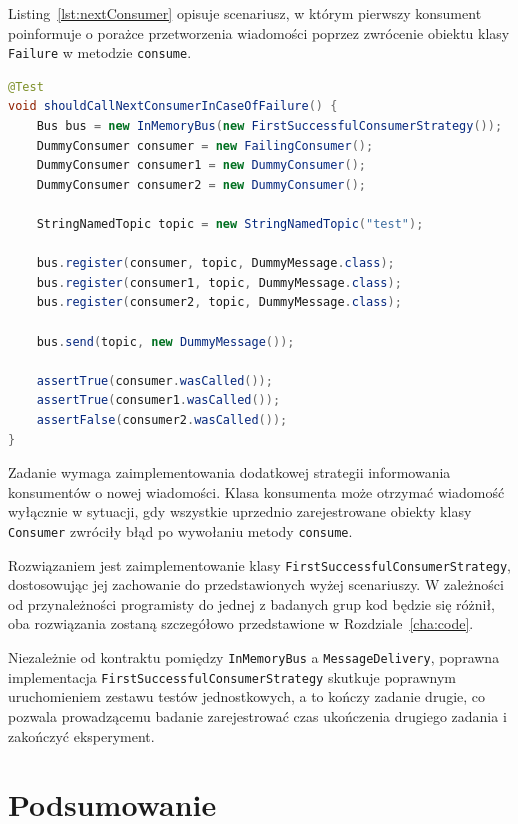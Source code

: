 Listing~\ref{lst:nextConsumer} opisuje scenariusz, w którym pierwszy konsument poinformuje o porażce przetworzenia
wiadomości poprzez zwrócenie obiektu klasy \texttt{Failure} w metodzie \texttt{consume}.

\begin{lstlisting}[language=Java,
    caption={Drugi test zadania drugiego --- jeżeli pierwszy konsument zwrócił błąd odbioru wiadomości, wyłącznie drugi
    konsument powinien ją otrzymać},
    label={lst:nextConsumer}]
@Test
void shouldCallNextConsumerInCaseOfFailure() {
    Bus bus = new InMemoryBus(new FirstSuccessfulConsumerStrategy());
    DummyConsumer consumer = new FailingConsumer();
    DummyConsumer consumer1 = new DummyConsumer();
    DummyConsumer consumer2 = new DummyConsumer();

    StringNamedTopic topic = new StringNamedTopic("test");

    bus.register(consumer, topic, DummyMessage.class);
    bus.register(consumer1, topic, DummyMessage.class);
    bus.register(consumer2, topic, DummyMessage.class);

    bus.send(topic, new DummyMessage());

    assertTrue(consumer.wasCalled());
    assertTrue(consumer1.wasCalled());
    assertFalse(consumer2.wasCalled());
}
\end{lstlisting}

Zadanie wymaga zaimplementowania dodatkowej strategii informowania konsumentów o nowej wiadomości.
Klasa konsumenta może otrzymać wiadomość wyłącznie w sytuacji, gdy wszystkie uprzednio zarejestrowane obiekty klasy
\texttt{Consumer} zwróciły błąd po wywołaniu metody \texttt{consume}.

Rozwiązaniem jest zaimplementowanie klasy \texttt{FirstSuccessfulConsumerStrategy}, dostosowując jej zachowanie do
przedstawionych wyżej scenariuszy.
W zależności od przynależności programisty do jednej z badanych grup kod będzie się różnił, oba rozwiązania zostaną
szczegółowo przedstawione w Rozdziale~\ref{cha:code}.

Niezależnie od kontraktu pomiędzy \texttt{InMemoryBus} a \texttt{MessageDelivery}, poprawna implementacja
\texttt{FirstSuccessfulConsumerStrategy} skutkuje poprawnym uruchomieniem zestawu testów jednostkowych, a to kończy
zadanie drugie, co pozwala prowadzącemu badanie zarejestrować czas ukończenia drugiego zadania i zakończyć eksperyment.


\section{Podsumowanie}

